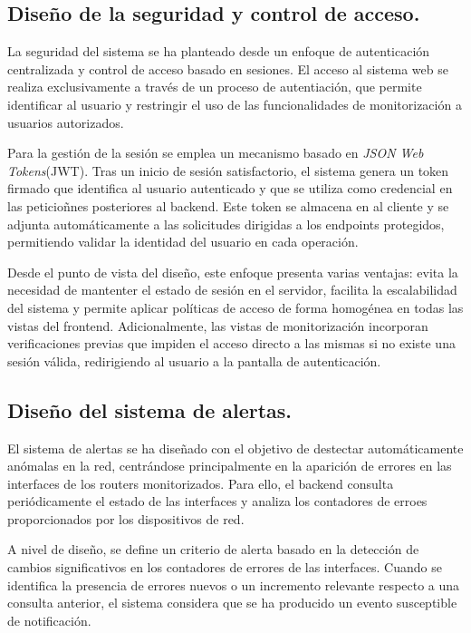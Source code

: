\subsection*{Diseño de la seguridad y control de acceso.}

La seguridad del sistema se ha planteado desde un enfoque de autenticación centralizada y control de acceso basado en sesiones. El acceso al sistema web se realiza exclusivamente a través de un proceso de autentiación, que permite identificar al usuario y restringir el uso de las funcionalidades de monitorización a usuarios autorizados.

Para la gestión de la sesión se emplea un mecanismo basado en \textit{JSON Web Tokens}(JWT). Tras un inicio de sesión satisfactorio, el sistema genera un token firmado que identifica al usuario autenticado y que se utiliza como credencial en las peticioñnes posteriores al backend. Este token se almacena en al cliente y se adjunta automáticamente a las solicitudes dirigidas a los endpoints protegidos, permitiendo validar la identidad del usuario en cada operación.

Desde el punto de vista del diseño, este enfoque presenta varias ventajas: evita la necesidad de mantenter el estado de sesión en el servidor, facilita la escalabilidad del sistema y permite aplicar políticas de acceso de forma homogénea en todas las vistas del frontend. Adicionalmente, las vistas de monitorización incorporan verificaciones previas que impiden el acceso directo a las mismas si no existe una sesión válida, redirigiendo al usuario a la pantalla de autenticación.

\subsection*{Diseño del sistema de alertas.}

El sistema de alertas se ha diseñado con el objetivo de destectar automáticamente anómalas en la red, centrándose principalmente en la aparición de errores en las interfaces de los routers monitorizados. Para ello, el backend consulta periódicamente el estado de las interfaces y analiza los contadores de erroes proporcionados por los dispositivos de red.

A nivel de diseño, se define un criterio de alerta basado en la detección de cambios significativos en los contadores de errores de las interfaces. Cuando se identifica la presencia de errores nuevos o un incremento relevante respecto a una consulta anterior, el sistema considera que se ha producido un evento susceptible de notificación.

